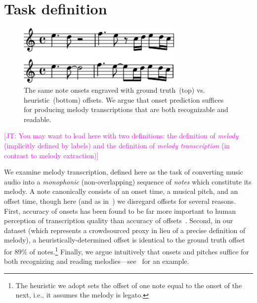 \documentclass{article}
\newcommand\john[1]{\textcolor{magenta}{[JT: #1]}}
\begin{document}


\section{Task definition}

\begin{figure}
    \centering
    \includegraphics[width=8.1cm]{figs/heuristic_offsets.pdf}
    \caption{
The same note onsets engraved with ground truth~(top) vs. heuristic~(bottom) offsets. 
We argue that onset prediction suffices for producing melody transcriptions that are both recognizable and readable. 
}
 \label{fig:heuristic_offsets}
\end{figure}

\john{You may want to lead here with two definitions: the definition of \emph{melody} (implicitly defined by labels) and the definition of \emph{melody transcription} (in contrast to melody extraction)}

We examine melody transcription, defined here as the task of converting music audio into a \emph{monophonic} (non-overlapping) sequence of \emph{notes} which constitute its melody. 
A note canonically consists of an onset time, a musical pitch, and an offset time, though here (and as in~\cite{laaksonen2014automatic}) we disregard offsets for several reasons. 
First, accuracy of onsets has been found to be far more important to human perception of transcription quality than accuracy of offsets~\cite{ycart2020investigating}. 
Second, in our dataset (which represents a crowdsourced proxy in lieu of a precise definition of melody), a heuristically-determined offset is identical to the ground truth offset for $89\%$ of notes.\footnote{The heuristic we adopt sets the offset of one note equal to the onset of the next, i.e., it assumes the melody is legato.}
Finally, we argue intuitively that onsets and pitches suffice for both recognizing and reading melodies---see~ for an example. 
\end{document}
